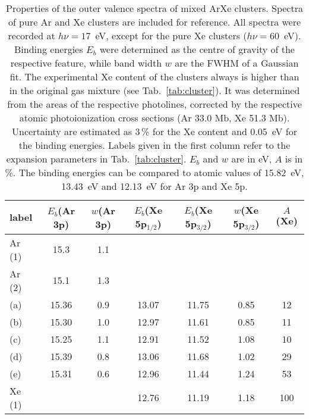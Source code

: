 \begin{table}
\caption{Properties of the outer valence spectra of mixed ArXe clusters. Spectra of pure Ar and Xe clusters are included for reference. All spectra were recorded at $h\nu = 17$~eV, except for the pure Xe clusters ($h\nu = 60$~eV). Binding energies $E_b$ were determined as the centre of gravity of the respective feature, while band width $w$ are the FWHM of a Gaussian fit. The experimental Xe content of the clusters always is higher than in the original gas mixture (see Tab.\ \protect\ref{tab:cluster}). It was determined from the areas of the respective photolines, corrected by the respective atomic photoionization cross sections (Ar 33.0 Mb, Xe 51.3 Mb)\cite{samson2002}. Uncertainty are estimated as 3\,\% for the Xe content and 0.05~eV for the binding energies. Labels given in the first column refer to the expansion parameters in Tab.\ \protect\ref{tab:cluster}. $E_b$ and $w$ are in eV, $A$ is in \%. The binding energies can be compared to atomic values of 15.82~eV, 13.43~eV and 12.13~eV for Ar 3p and Xe 5p.
\label{tab:valence} }
\begin{tabular}{ l c c c c c c}
%
\toprule
  label & $E_b$(Ar 3p) & $w$(Ar 3p) & $E_b$(Xe 5p$_{1/2}$) &  $E_b$(Xe 5p$_{3/2}$) & $w$(Xe 5p$_{3/2}$)  &  $A$(Xe) \\
%
\midrule
 Ar (1) &  15.3  &  1.1 & & & &  \\
 Ar (2) &  15.1  &  1.3 & & & &  \\
%
 (a) & 15.36 & 0.9 & 13.07 & 11.75 & 0.85 & 12\\
 (b) & 15.30 & 1.0 & 12.97 & 11.61 & 0.85 & 11\\
 (c) & 15.25 & 1.1 & 12.91 & 11.52 & 1.08 & 10\\
 (d) & 15.39 & 0.8 & 13.06 & 11.68 & 1.02 & 29\\
 (e) & 15.31 & 0.6 & 12.96 & 11.44 & 1.24 & 53\\
Xe (1) & & & 12.76 & 11.19 & 1.18 & 100\\
%
\bottomrule
\end{tabular}
\end{table}
